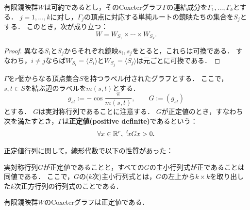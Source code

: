 \begin{theorem}
  有限鏡映群$W$は可約であるとし，そのCoxeterグラフ$\Gamma$の連結成分を$\Gamma_1, \ldots, \Gamma_k$とする．
  $j = 1, \ldots, k$に対し，$\Gamma_j$の頂点に対応する単純ルートの鏡映たちの集合を$S_j$とする．
  このとき，次が成り立つ：
  \begin{equation}
    W = W_{S_1} \times \cdots \times W_{S_k}.
  \end{equation}
\end{theorem}

\begin{proof}
  異なる$S_i$と$S_j$からそれぞれ鏡映$s_i, s_j$をとると，これらは可換である．
  すなわち，$i \ne j$ならば$W_{S_i} = \langle S_i \rangle$と$W_{S_j} = \langle S_j \rangle$は元ごとに可換である．
\end{proof}
\fi

\begin{definition}
  $\Gamma$を$r$個からなる頂点集合$S$を持つラベル付されたグラフとする．
  ここで，$s, t \in S$を結ぶ辺のラベルを$m(s, t)$とする．
  \begin{equation}
    g_{st} := -\cos \frac{\pi}{m(s, t)},\qquad G := (g_{st})
  \end{equation}
  とする．
  $G$は実対称行列であることに注意する．
  $G$が正定値のとき，すなわち次を満たすとき，$\Gamma$は\textbf{正定値(positive definite)}であるという：
  \begin{equation}
    \forall x \in \mathbb{R}^r,\ {}^t\!x G x > 0.
  \end{equation}
\end{definition}

正定値行列に関して，線形代数で以下の性質があった：
\begin{lemma} \label{lem:pos_def_det}
  実対称行列$G$が正定値であることと，すべての$G$の主小行列式が正であることは同値である．
  ここで，$G$の($k$次)主小行列式とは，$G$の左上から$k \times k$を取り出した$k$次正方行列の行列式のことである．
\end{lemma}

\begin{lemma} \label{lem:FRG_Coxeter_diagram_posirive}
  有限鏡映群$W$のCoxeterグラフは正定値である．
\end{lemma}

